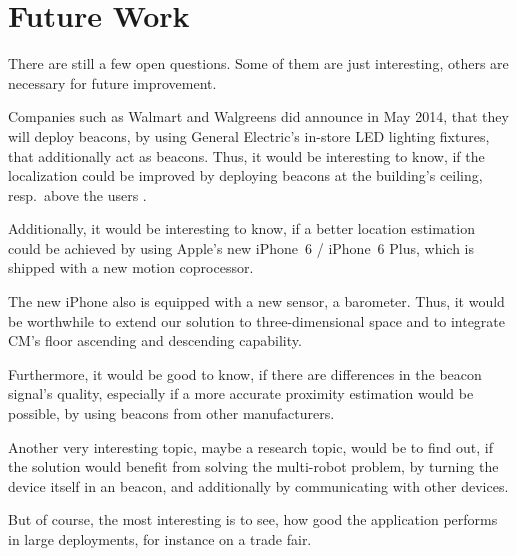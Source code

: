 \section{Future Work} \label{sec:future}
There are still a few open questions. Some of them are just interesting, others are necessary for future improvement.

Companies such as Walmart and Walgreens did announce in May 2014, that they will deploy beacons, by using General Electric's in-store LED lighting fixtures, that additionally act as beacons. Thus, it would be interesting to know, if the localization could be improved by deploying beacons at the building's ceiling, resp.\ above the users \citep{9to5mac}.

Additionally, it would be interesting to know, if a better location estimation could be achieved by using Apple's new iPhone~6 / iPhone~6 Plus, which is shipped with a new motion coprocessor.

The new iPhone also is equipped with a new sensor, a barometer. Thus, it would be worthwhile to extend our solution to three-dimensional space and to integrate \acl{CM}'s floor ascending and descending capability.

Furthermore, it would be good to know, if there are differences in the beacon signal's quality, especially if a more accurate proximity estimation would be possible, by using beacons from other manufacturers.

Another very interesting topic, maybe a research topic, would be to find out, if the solution would benefit from solving the multi-robot problem, by turning the device itself in an beacon, and additionally by communicating with other devices.

But of course, the most interesting is to see, how good the application performs in large deployments, for instance on a trade fair.

